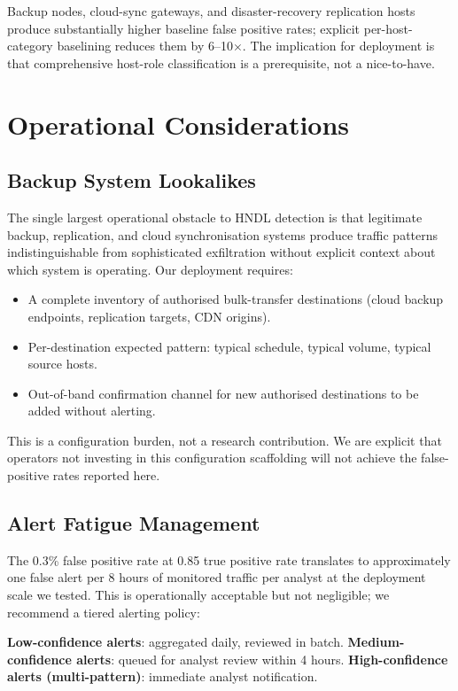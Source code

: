 \documentclass[sigconf,nonacm]{acmart}
\begin{document}
Backup nodes, cloud-sync gateways, and disaster-recovery replication
hosts produce substantially higher baseline false positive rates;
explicit per-host-category baselining reduces them by 6--10$\times$.
The implication for deployment is that comprehensive host-role
classification is a prerequisite, not a nice-to-have.

\section{Operational Considerations}

\subsection{Backup System Lookalikes}

The single largest operational obstacle to HNDL detection is that
legitimate backup, replication, and cloud synchronisation systems
produce traffic patterns indistinguishable from sophisticated
exfiltration without explicit context about which system is operating.
Our deployment requires:

\begin{itemize}
  \item A complete inventory of authorised bulk-transfer destinations
        (cloud backup endpoints, replication targets, CDN origins).
  \item Per-destination expected pattern: typical schedule, typical
        volume, typical source hosts.
  \item Out-of-band confirmation channel for new authorised
        destinations to be added without alerting.
\end{itemize}

This is a configuration burden, not a research contribution. We are
explicit that operators not investing in this configuration scaffolding
will not achieve the false-positive rates reported here.

\subsection{Alert Fatigue Management}

The 0.3\% false positive rate at 0.85 true positive rate translates
to approximately one false alert per 8 hours of monitored traffic per
analyst at the deployment scale we tested. This is operationally
acceptable but not negligible; we recommend a tiered alerting policy:

\textbf{Low-confidence alerts}: aggregated daily, reviewed in batch.
\textbf{Medium-confidence alerts}: queued for analyst review within
4 hours.
\textbf{High-confidence alerts (multi-pattern)}: immediate analyst
notification.
\end{document}
